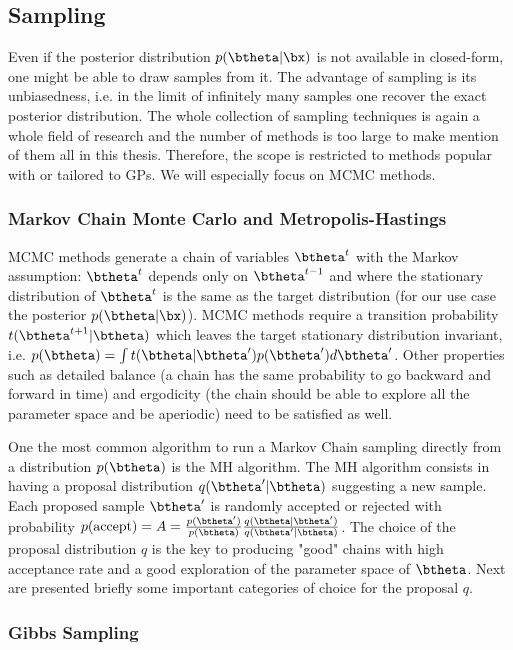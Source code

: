 \subsection{Sampling}

Even if the posterior distribution $p(\btheta|\bx)$ is not available in closed-form, one might be able to draw samples from it.
The advantage of sampling is its unbiasedness, i.e. in the limit of infinitely many samples one recover the exact posterior distribution.
The whole collection of sampling techniques is again a whole field of research and the number of methods is too large to make mention of them all in this thesis.
Therefore, the scope is restricted to methods popular with or tailored to \ac{GPs}.
We will especially focus on \ac{MCMC} methods.
\subsubsection{Markov Chain Monte Carlo and Metropolis-Hastings}

\acf{MCMC} methods generate a chain of variables $\btheta^t$ with the Markov assumption: $\btheta^t$ depends only on $\btheta^{t-1}$ and where the stationary distribution of $\btheta^t$ is the same as the target distribution (for our use case the posterior $p(\btheta|\bx)$).
\ac{MCMC} methods require a transition probability $t(\btheta^{t+1}|\btheta)$ which leaves the target stationary distribution invariant, i.e. $p(\btheta) = \int t(\btheta|\btheta')p(\btheta')d\btheta'$.
Other properties such as detailed balance (a chain has the same probability to go backward and forward in time) and ergodicity (the chain should be able to explore all the parameter space and be aperiodic) need to be satisfied as well.

One the most common algorithm to run a Markov Chain sampling directly from a distribution $p(\btheta)$ is the \acf{MH} algorithm.
The \ac{MH} algorithm consists in having a proposal distribution $q(\btheta'|\btheta)$ suggesting a new sample.
Each proposed sample $\btheta'$ is randomly accepted or rejected with probability $p(\text{accept}) = A = \frac{p(\btheta')}{p(\btheta)}\frac{q(\btheta|\btheta')}{q(\btheta'|\btheta)}$.
The choice of the proposal distribution $q$ is the key to producing "good" chains with high acceptance rate and a good exploration of the parameter space of $\btheta$.
Next are presented briefly some important categories of choice for the proposal $q$.


\subsubsection{Gibbs Sampling}

